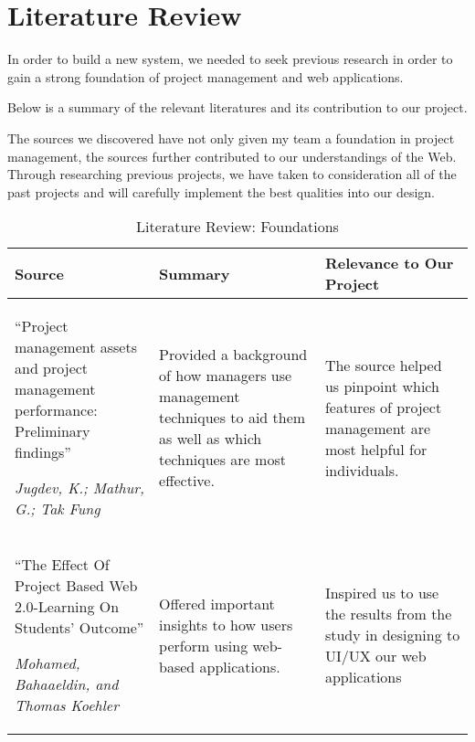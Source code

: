 \section{Literature Review}

In order to build a new system, we needed to seek previous research in order to gain a strong foundation of project management and web applications. 

Below is a summary of  the relevant literatures and its contribution to our project.

\par The sources we discovered have not only given my team a foundation in project management, the sources further contributed to our understandings of the Web. Through researching previous projects, we have taken to consideration all of the past projects and will carefully implement the best qualities into our design. 

\FloatBarrier
\begin{table}%
\caption{Literature Review: Foundations}\label{FoundationLitReview}
\begin{tabularx}{\textwidth}{|X|X|X|}
    \hline
    \textbf{Source} & \textbf{Summary} & \textbf{Relevance to Our Project}\\
    \hline
    ``Project management assets and project management performance: Preliminary findings''
     \par \textit{Jugdev, K.; Mathur, G.; Tak Fung} & Provided a background of how managers use management techniques to aid them as well as which techniques are most effective. & The source helped us pinpoint which features of project management are most helpful for individuals. \\
    \hline 
    ``The Effect Of Project Based Web 2.0-Learning On Students' Outcome''
	\par \textit{Mohamed, Bahaaeldin, and Thomas Koehler} & Offered important insights to how users perform using web-based applications. & Inspired us to use the results from the study in designing to UI/UX our web applications \\
	\hline
\end{tabularx}
\end{table}%

